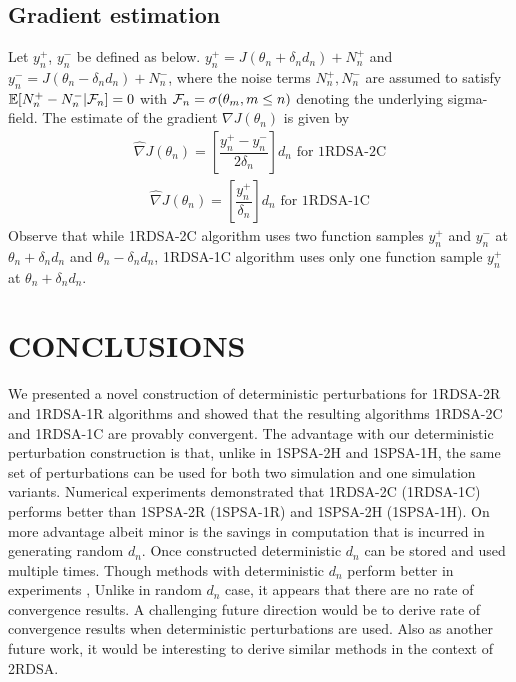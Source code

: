 \documentclass[letterpaper, 10 pt, conference]{ieeeconf}  %
\begin{document}
\subsection{Gradient estimation}
Let $y_{n}^{+}$, $y_{n}^{-}$  be defined as below.
$y_{n}^{+} = J(\theta_n+\delta_n d_n) + N_{n}^{+}$ and 
$y_{n}^{-} = J(\theta_n-\delta_n d_n) + N_{n}^{-}$,
where the noise terms $N_{n}^{+}, N_{n}^{-}$ are assumed to satisfy $\mathbb{E}[N_{n}^{+}- 
N_{n}^{-}| \mathcal{F}_n] = 0$ with $\mathcal{F}_n = \sigma(\theta_m, m\le n)$ 
denoting the underlying sigma-field. 
The estimate of the gradient $\nabla J(\theta_n)$ is given by
\begin{align}
\label{eq:grad-twosided}
\widehat\nabla J(\theta_n)=
\left[\dfrac{y_{n}^{+} - y_{n}^{-}}{2\delta_n}\right]d_n \text{ 	for 1RDSA-2C}
\end{align}
\begin{align}
\label{eq:grad-onesided}
\widehat\nabla J(\theta_n)=
\left[\dfrac{y_{n}^{+}}{\delta_n}\right]d_n \text{ 	for 1RDSA-1C}
\end{align}
Observe that while 1RDSA-2C algorithm uses two function samples $y_{n}^{+}$ and $y_{n}^{-}$ 
at $\theta_n+\delta_n d_n$ and $\theta_n - \delta_n d_n$, 1RDSA-1C algorithm 
uses only one function sample $y_{n}^{+}$ at $\theta_n+\delta_n d_n$.


\section{CONCLUSIONS}
\label{sec:conclusions}
We presented a novel construction of deterministic perturbations for 
1RDSA-2R and 1RDSA-1R algorithms and showed that the resulting algorithms 
1RDSA-2C and 1RDSA-1C are provably convergent. 
The advantage with our deterministic perturbation construction is that, unlike in 1SPSA-2H and 1SPSA-1H, 
the same set of perturbations can be used for both two simulation
and one simulation variants. Numerical experiments demonstrated that 1RDSA-2C (1RDSA-1C) performs better 
than 1SPSA-2R (1SPSA-1R) and 1SPSA-2H (1SPSA-1H). On more advantage albeit minor is the savings in 
computation that is incurred in generating random $d_n$. Once constructed deterministic $d_n$ can be stored
and used multiple times. 
Though methods with deterministic $d_n$ perform better in experiments \cite{bhatnagar2003two},
Unlike in random $d_n$ case, it appears that there are no rate of convergence results. 
A challenging future direction would be to derive rate of convergence 
results when deterministic perturbations are used. Also as another future work, it would be 
interesting to derive similar methods in the context of 2RDSA. 


\end{document}
